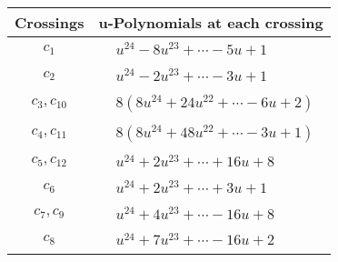 \documentclass[1p]{elsarticle_modified}
\theoremstyle{definition}
\begin{document}
\begin{tabular}{m{50pt}|m{274pt}}
Crossings & \hspace{64pt}u-Polynomials at each crossing \\
\hline $$\begin{aligned}c_{1}\end{aligned}$$&$\begin{aligned}
&u^{24}-8 u^{23}+\cdots-5 u+1
\end{aligned}$\\
\hline $$\begin{aligned}c_{2}\end{aligned}$$&$\begin{aligned}
&u^{24}-2 u^{23}+\cdots-3 u+1
\end{aligned}$\\
\hline $$\begin{aligned}c_{3},c_{10}\end{aligned}$$&$\begin{aligned}
&8(8 u^{24}+24 u^{22}+\cdots-6 u+2)
\end{aligned}$\\
\hline $$\begin{aligned}c_{4},c_{11}\end{aligned}$$&$\begin{aligned}
&8(8 u^{24}+48 u^{22}+\cdots-3 u+1)
\end{aligned}$\\
\hline $$\begin{aligned}c_{5},c_{12}\end{aligned}$$&$\begin{aligned}
&u^{24}+2 u^{23}+\cdots+16 u+8
\end{aligned}$\\
\hline $$\begin{aligned}c_{6}\end{aligned}$$&$\begin{aligned}
&u^{24}+2 u^{23}+\cdots+3 u+1
\end{aligned}$\\
\hline $$\begin{aligned}c_{7},c_{9}\end{aligned}$$&$\begin{aligned}
&u^{24}+4 u^{23}+\cdots-16 u+8
\end{aligned}$\\
\hline $$\begin{aligned}c_{8}\end{aligned}$$&$\begin{aligned}
&u^{24}+7 u^{23}+\cdots-16 u+2
\end{aligned}$\\
\hline
\end{tabular}\\~\\
\end{document}

